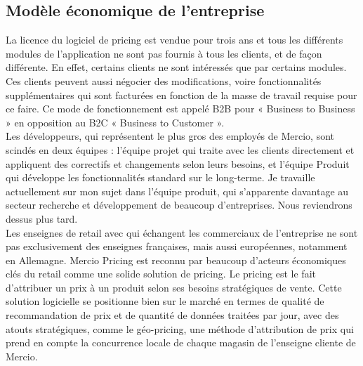 \documentclass{rapportCS}
\begin{document}
\subsection{Modèle économique de l'entreprise}
La licence du logiciel de pricing est vendue pour trois ans et tous les différents modules de 
l'application ne sont pas fournis à tous les clients, et de façon différente.
En effet, certains clients ne sont intéressés que par certains modules.
Ces clients peuvent aussi négocier des modifications, voire fonctionnalités supplémentaires 
qui sont facturées en fonction de la masse de travail requise pour ce faire. 
Ce mode de fonctionnement est appelé B2B pour « Business to Business » en opposition 
au B2C « Business to Customer ». \\
Les développeurs, qui représentent le plus gros des employés de Mercio, sont scindés en 
deux équipes : l'équipe projet qui traite avec les clients directement et appliquent des 
correctifs et changements selon leurs besoins, et l'équipe Produit qui développe les 
fonctionnalités standard sur le long-terme. Je travaille actuellement sur mon sujet dans 
l'équipe produit, qui s'apparente davantage au secteur recherche et développement de beaucoup 
d'entreprises. Nous reviendrons dessus plus tard. \\
Les enseignes de retail avec qui échangent les commerciaux de l'entreprise ne sont pas 
exclusivement des enseignes françaises, mais aussi européennes, notamment en Allemagne.
Mercio Pricing est reconnu par beaucoup d'acteurs économiques clés du retail comme une solide 
solution de pricing. 
Le pricing est le fait d'attribuer un prix à un produit selon ses besoins stratégiques de vente. 
Cette solution logicielle se positionne bien sur le marché en termes de qualité de recommandation 
de prix et de quantité de données traitées par jour, avec des atouts stratégiques, comme le
géo-pricing, une méthode d'attribution de prix qui prend en compte la concurrence locale de chaque magasin de 
l'enseigne cliente de Mercio. \\
\end{document}
